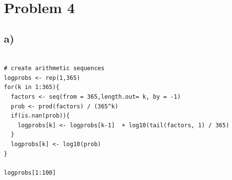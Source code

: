 \documentclass[11pt]{article}
\begin{document}
\section*{Problem 4}
\label{sec:org0614363}
\subsection*{a)}
\label{sec:org8f80a17}

\begin{verbatim}

# create arithmetic sequences
logprobs <- rep(1,365)
for(k in 1:365){
  factors <- seq(from = 365,length.out= k, by = -1)
  prob <- prod(factors) / (365^k)
  if(is.nan(prob)){
    logprobs[k] <- logprobs[k-1]  + log10(tail(factors, 1) / 365)
  }
  logprobs[k] <- log10(prob)
}

logprobs[1:100]
\end{verbatim}
\end{document}
